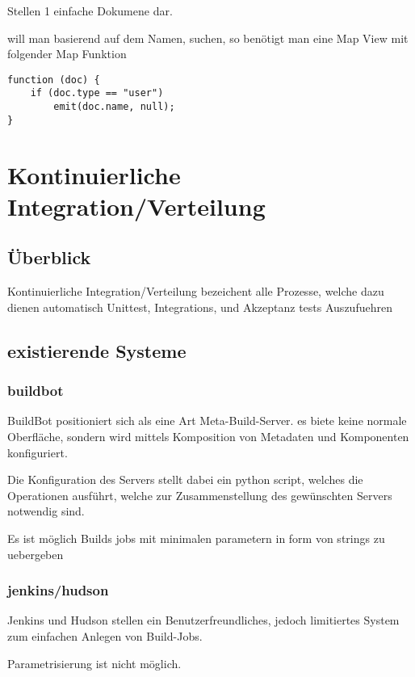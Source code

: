 Stellen 1 einfache Dokumene dar.

will man basierend auf dem Namen, suchen, so benötigt man eine Map View mit folgender Map Funktion
\begin{lstlisting}
function (doc) {
    if (doc.type == "user")
        emit(doc.name, null);
}
\end{lstlisting}



\section{Kontinuierliche Integration/Verteilung}

\subsection{Überblick}

Kontinuierliche Integration/Verteilung bezeichent alle Prozesse,
welche dazu dienen automatisch Unittest, Integrations, und Akzeptanz tests Auszufuehren


\subsection{existierende Systeme}

\subsubsection{buildbot}

BuildBot positioniert sich als eine Art Meta-Build-Server.
es biete keine normale Oberfläche, sondern wird mittels
Komposition von Metadaten und Komponenten konfiguriert.

Die Konfiguration des Servers stellt dabei ein python script,
welches die Operationen ausführt, welche zur Zusammenstellung des gewünschten Servers notwendig sind.

Es ist möglich Builds jobs mit minimalen parametern in form von strings zu uebergeben

\subsubsection{jenkins/hudson}

Jenkins und Hudson stellen ein Benutzerfreundliches,
jedoch limitiertes System zum einfachen Anlegen von Build-Jobs.

Parametrisierung ist nicht möglich.
